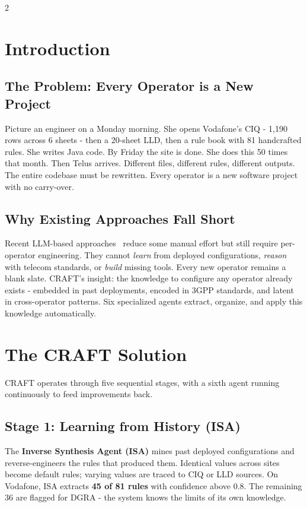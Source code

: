 \documentclass[10pt]{article}
\begin{document}
\begin{multicols}{2}
\section{Introduction}
\subsection*{The Problem: Every Operator is a New Project}
Picture an engineer on a Monday morning. She opens Vodafone's CIQ - 1,190 rows across 6 sheets - then a 20-sheet LLD, then a rule book with 81 handcrafted rules. She writes Java code. By Friday the site is done. She does this 50 times that month.
Then Telus arrives. Different files, different rules, different outputs. The entire codebase must be rewritten. Every operator is a new software project with no carry-over.
\subsection*{Why Existing Approaches Fall Short}
Recent LLM-based approaches~\cite{lira2024largelanguagemodelszero,provvedi2026intentllm,wang2026llmpowered} reduce some manual effort but still require per-operator engineering. They cannot \emph{learn} from deployed configurations, \emph{reason} with telecom standards, or \emph{build} missing tools. Every new operator remains a blank slate.
CRAFT's insight: the knowledge to configure any operator already exists - embedded in past deployments, encoded in 3GPP standards, and latent in cross-operator patterns. Six specialized agents extract, organize, and apply this knowledge automatically.
\section{The CRAFT Solution}
CRAFT operates through five sequential stages, with a sixth agent running continuously to feed improvements back.
\subsection*{Stage 1: Learning from History (ISA)}
The \textbf{Inverse Synthesis Agent (ISA)} mines past deployed configurations and reverse-engineers the rules that produced them. Identical values across sites become default rules; varying values are traced to CIQ or LLD sources. On Vodafone, ISA extracts \textbf{45 of 81 rules} with confidence above 0.8. The remaining 36 are flagged for DGRA - the system knows the limits of its own knowledge.

\end{multicols}
\end{document}
